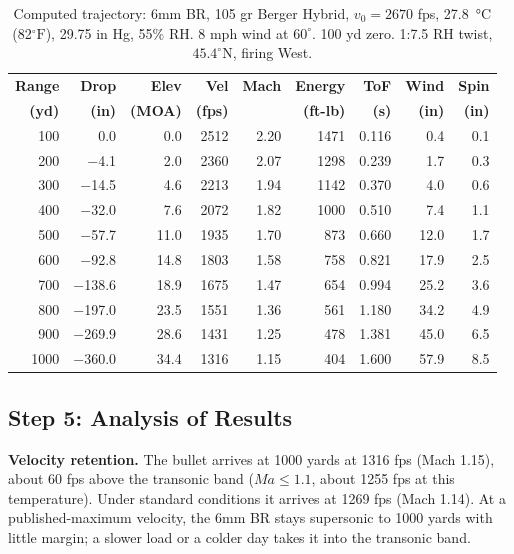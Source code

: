 \documentclass[11pt,twoside,openright]{report}
\newcommand{\Mach}{\mathit{Ma}}
\newcommand{\degF}{\ensuremath{{}^{\circ}\mathrm{F}}}
\begin{document}
\begin{table}[H]
\centering
\caption{Computed trajectory: 6mm BR, 105 gr Berger Hybrid, $v_0 = 2670$ fps, \protect\SI{27.8}{\celsius} (82\protect\degF), 29.75 in Hg, 55\% RH. 8 mph wind at $60^{\circ}$. 100 yd zero. 1:7.5 RH twist, $45.4^{\circ}$N, firing West.}
\label{tab:6br_trajectory}
\small
\begin{tabular}{@{}rrrrrrrrr@{}}
\toprule
\textbf{Range} & \textbf{Drop} & \textbf{Elev} & \textbf{Vel} & \textbf{Mach} & \textbf{Energy} & \textbf{ToF} & \textbf{Wind} & \textbf{Spin} \\
\textbf{(yd)} & \textbf{(in)} & \textbf{(MOA)} & \textbf{(fps)} & & \textbf{(ft-lb)} & \textbf{(s)} & \textbf{(in)} & \textbf{(in)} \\
\midrule
100  &    0.0 &   0.0 & 2512 & 2.20 & 1471 & 0.116 &   0.4 & 0.1 \\
200  &  $-$4.1 &   2.0 & 2360 & 2.07 & 1298 & 0.239 &   1.7 & 0.3 \\
300  & $-$14.5 &   4.6 & 2213 & 1.94 & 1142 & 0.370 &   4.0 & 0.6 \\
400  & $-$32.0 &   7.6 & 2072 & 1.82 & 1000 & 0.510 &   7.4 & 1.1 \\
500  & $-$57.7 &  11.0 & 1935 & 1.70 &  873 & 0.660 &  12.0 & 1.7 \\
600  & $-$92.8 &  14.8 & 1803 & 1.58 &  758 & 0.821 &  17.9 & 2.5 \\
700  &$-$138.6 &  18.9 & 1675 & 1.47 &  654 & 0.994 &  25.2 & 3.6 \\
800  &$-$197.0 &  23.5 & 1551 & 1.36 &  561 & 1.180 &  34.2 & 4.9 \\
900  &$-$269.9 &  28.6 & 1431 & 1.25 &  478 & 1.381 &  45.0 & 6.5 \\
1000 &$-$360.0 &  34.4 & 1316 & 1.15 &  404 & 1.600 &  57.9 & 8.5 \\
\bottomrule
\end{tabular}
\end{table}

\subsection{Step 5: Analysis of Results}

\textbf{Velocity retention.} The bullet arrives at 1000 yards at 1316 fps (Mach 1.15), about 60 fps above the transonic band ($\Mach \leq 1.1$, about 1255 fps at this temperature). Under standard conditions it arrives at 1269 fps (Mach 1.14). At a published-maximum velocity, the 6mm BR stays supersonic to 1000 yards with little margin; a slower load or a colder day takes it into the transonic band.
\end{document}
